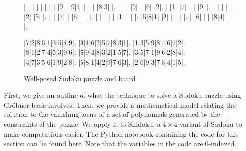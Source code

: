 \documentclass[../main.tex]{subfiles}
\begin{document}
        \begin{figure}[h!]
            \centering
            \begin{sudoku-block}
                | | | | | | | | |9|.
                |9|4| | | | |8|3| |.
                | | | |9| | |6| |2|.
                | |1| |7| | | |9| |.
                | | | | | |2| |5| |.
                | | |7| | |6| | | |.
                | | | | | |1| | | |.
                |5|8|1| |2| | | | |.
                | |6| | | |8|4| | |.
            \end{sudoku-block}
            \hspace*{10pt}
            \begin{sudoku-block}
                |7|2|8|6|1|3|5|4|9|.
                |9|4|6|2|5|7|8|3|1|.
                |1|3|5|9|8|4|6|7|2|.
                |8|1|2|7|4|5|3|9|6|.
                |6|9|4|8|3|2|1|5|7|.
                |3|5|7|1|9|6|2|8|4|.
                |4|7|3|5|6|1|9|2|8|.
                |5|8|1|4|2|9|7|6|3|.
                |2|6|9|3|7|8|4|1|5|.
            \end{sudoku-block}
            \caption{Well-posed Sudoku puzzle and board}
            \label{board}
        \end{figure}

        First, we give an outline of what the technique to solve a Sudoku puzzle using Gr\"obner basis involves. Then, we provide a mathematical model relating the solution to the vanishing locus of a set of polynomials generated by the constraints of the puzzle. We apply it to Shidoku, a $4\times 4$ variant of Sudoku to make computations easier. The Python notebook containing the code for this section can be found \href{https://github.com/yangdabei/graph-colouring-and-sudoku/blob/main/example_shidoku.ipynb}{here}. Note that the variables in the code are 0-indexed.
\end{document}
